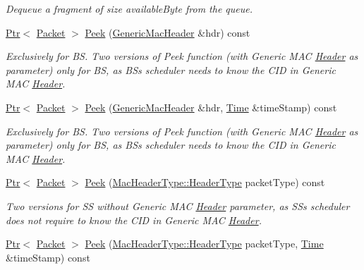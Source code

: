 \begin{DoxyCompactItemize}
\begin{DoxyCompactList}\small\item\em Dequeue a fragment of size available\+Byte from the queue. \end{DoxyCompactList}\item 
\hyperlink{classns3_1_1Ptr}{Ptr}$<$ \hyperlink{classns3_1_1Packet}{Packet} $>$ \hyperlink{classns3_1_1WimaxMacQueue_a7bf8900208851fcfca4466dd9b932fb3}{Peek} (\hyperlink{classns3_1_1GenericMacHeader}{Generic\+Mac\+Header} \&hdr) const 
\begin{DoxyCompactList}\small\item\em Exclusively for BS. Two versions of Peek function (with Generic M\+AC \hyperlink{classns3_1_1Header}{Header} as parameter) only for BS, as BS\textquotesingle{}s scheduler needs to know the C\+ID in Generic M\+AC \hyperlink{classns3_1_1Header}{Header}. \end{DoxyCompactList}\item 
\hyperlink{classns3_1_1Ptr}{Ptr}$<$ \hyperlink{classns3_1_1Packet}{Packet} $>$ \hyperlink{classns3_1_1WimaxMacQueue_ae09bc0203b50fb1f0d377cdcc1ee4e9c}{Peek} (\hyperlink{classns3_1_1GenericMacHeader}{Generic\+Mac\+Header} \&hdr, \hyperlink{classns3_1_1Time}{Time} \&time\+Stamp) const 
\begin{DoxyCompactList}\small\item\em Exclusively for BS. Two versions of Peek function (with Generic M\+AC \hyperlink{classns3_1_1Header}{Header} as parameter) only for BS, as BS\textquotesingle{}s scheduler needs to know the C\+ID in Generic M\+AC \hyperlink{classns3_1_1Header}{Header}. \end{DoxyCompactList}\item 
\hyperlink{classns3_1_1Ptr}{Ptr}$<$ \hyperlink{classns3_1_1Packet}{Packet} $>$ \hyperlink{classns3_1_1WimaxMacQueue_adb1a4885bd8be2e4245ad7e494c48ea7}{Peek} (\hyperlink{classns3_1_1MacHeaderType_a54d8fc8bc93a2b7865627965cdd31c20}{Mac\+Header\+Type\+::\+Header\+Type} packet\+Type) const 
\begin{DoxyCompactList}\small\item\em Two versions for SS without Generic M\+AC \hyperlink{classns3_1_1Header}{Header} parameter, as SS\textquotesingle{}s scheduler does not require to know the C\+ID in Generic M\+AC \hyperlink{classns3_1_1Header}{Header}. \end{DoxyCompactList}\item 
\hyperlink{classns3_1_1Ptr}{Ptr}$<$ \hyperlink{classns3_1_1Packet}{Packet} $>$ \hyperlink{classns3_1_1WimaxMacQueue_ad7697d4f2831b59dedfb3ad4b1c65c40}{Peek} (\hyperlink{classns3_1_1MacHeaderType_a54d8fc8bc93a2b7865627965cdd31c20}{Mac\+Header\+Type\+::\+Header\+Type} packet\+Type, \hyperlink{classns3_1_1Time}{Time} \&time\+Stamp) const 

\end{DoxyCompactItemize}

